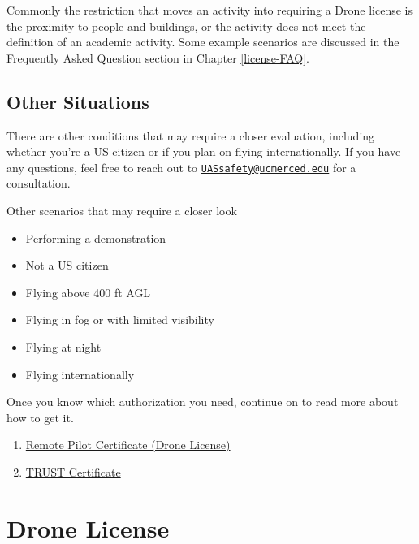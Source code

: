 \documentclass[
  12pt,
]{book}
\providecommand{\tightlist}{%
  \setlength{\itemsep}{0pt}\setlength{\parskip}{0pt}}
\newenvironment{notebox}{
  \definecolor{shadecolor}{gray}{.8}  %
  \color{black}
  \begin{shaded}}
 {\end{shaded}}
\begin{document}
\begin{notebox}
Commonly the restriction that moves an activity into requiring a Drone license is the proximity to people and buildings, or the activity does not meet the definition of an academic activity. Some example scenarios are discussed in the Frequently Asked Question section in Chapter \ref{license-FAQ}.

\end{notebox}

\hypertarget{other-situations}{%
\subsection{Other Situations}\label{other-situations}}

There are other conditions that may require a closer evaluation, including whether you're a US citizen or if you plan on flying internationally. If you have any questions, feel free to reach out to \href{mailto:UASsafety@ucmerced.edu}{\nolinkurl{UASsafety@ucmerced.edu}} for a consultation.

Other scenarios that may require a closer look

\begin{itemize}
\tightlist
\item
  Performing a demonstration
\item
  Not a US citizen
\item
  Flying above 400 ft AGL
\item
  Flying in fog or with limited visibility
\item
  Flying at night
\item
  Flying internationally
\end{itemize}

Once you know which authorization you need, continue on to read more about how to get it.

\begin{enumerate}
\def\labelenumi{\arabic{enumi}.}
\tightlist
\item
  \protect\hyperlink{get-license}{Remote Pilot Certificate (Drone License)}
\item
  \protect\hyperlink{TRUST}{TRUST Certificate}
\end{enumerate}

\hypertarget{get-license}{%
\section{Drone License}\label{get-license}}
\end{document}
